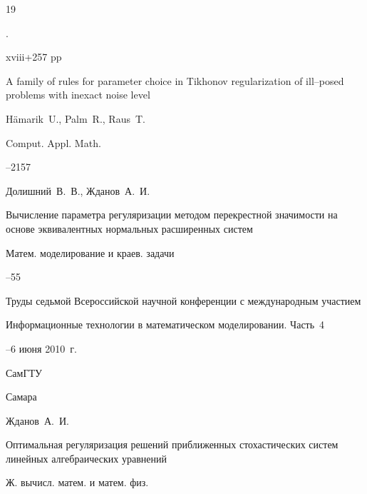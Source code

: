 \begin{thebibliography}{19}

.

\totalpages  xviii+257 pp \nofrills





\paper A family of rules for parameter choice in Tikhonov regularization of ill–posed problems with inexact noise level

\by H\"amarik~U., Palm~R., Raus~T.

\jour Comput. Appl. Math.




--2157





\by Долишний~В.~В., Жданов~А.~И.

\paper Вычисление параметра регуляризации методом перекрестной значимости на основе эквивалентных нормальных расширенных систем

\serial Матем. моделирование и краев. задачи


--55

\inbook Труды седьмой Всероссийской научной конференции с международным участием

\bookinfo Информационные технологии в математическом моделировании. \rm Часть~4

–6 июня 2010~г.


\publ СамГТУ

\publaddr Самара







\by Жданов~А.~И.

\paper Оптимальная регуляризация решений приближенных стохастических систем линейных алгебраических уравнений

\jour Ж. вычисл. матем. и матем. физ.




\end{thebibliography}

